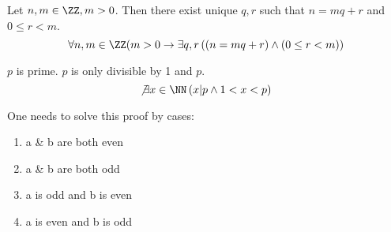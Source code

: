 \begin{example}
Let $n,m\in\ZZ,m>0$. Then there exist unique $q,r$ such that $n=mq+r$ and $0\le r < m$.
\[ \forall n,m\in \ZZ (m > 0 \to \exists q,r \left( \left( n=mq+r \right) \wedge \left( 0 \le r < m \right) \right) \]
\end{example}

\begin{example}[Problem 3]
$p$ is prime. $p$ is only divisible by 1 and $p$.
\[ \not \exists x \in \NN \left( x|p \wedge 1 < x < p \right) \]
\end{example}

\begin{example}[Problem 4]
One needs to solve this proof by cases:
\begin{enumerate}
\item a \& b are both even
\item a \& b are both odd
\item a is odd and b is even
\item a is even and b is odd
\end{enumerate}
\end{example}


